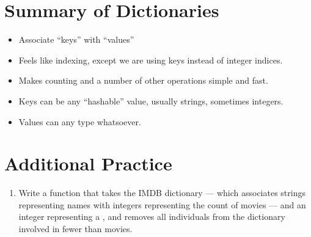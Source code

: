 \documentclass[letterpaper,10pt,english]{sphinxmanual}
\begin{document}
\section{Summary of Dictionaries}
\label{\detokenize{lecture_notes/lec16_dictionaries1:summary-of-dictionaries}}\begin{itemize}
\item {} 
Associate “keys” with “values”

\item {} 
Feels like indexing, except we are using keys instead of integer
indices.

\item {} 
Makes counting and a number of other operations simple and fast.

\item {} 
Keys can be any “hashable” value, usually strings, sometimes
integers.

\item {} 
Values can any type whatsoever.

\end{itemize}


\section{Additional Practice}
\label{\detokenize{lecture_notes/lec16_dictionaries1:additional-practice}}\begin{enumerate}
\item {} 
Write a function that takes the IMDB dictionary — which associates
strings representing names with integers representing the count of
movies — and an integer representing a , and removes all
individuals from the dictionary involved in fewer than 
movies.

\end{enumerate}
\end{document}
